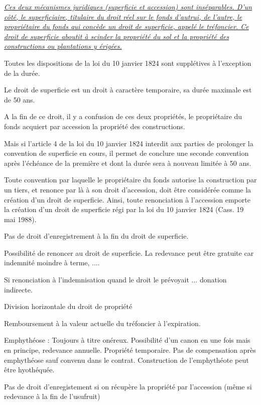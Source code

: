 \documentclass{book}
\begin{document}
\underline{\textit{Ces deux mécanismes juridiques (superficie et accession) sont inséparables. D’un côté, le superficiaire, titulaire du droit réel sur le fonds d’autrui, de l’autre, le propriétaire du fonds qui concède un droit de superficie, appelé le tréfoncier. Ce droit de superficie aboutit à scinder la propriété du sol et la propriété des constructions ou plantations y érigées.}}

Toutes les dispositions de la loi du 10 janvier 1824 sont supplétives à l’exception de la durée.

Le droit de superficie est un droit à caractère temporaire, sa durée maximale est de 50 ans.

A la fin de ce droit, il y a confusion de ces deux propriétés, le propriétaire du fonds acquiert par accession la propriété des constructions.

Mais si l’article 4 de la loi du 10 janvier 1824 interdit aux parties de prolonger la convention de superficie en cours, il permet de conclure une seconde convention après l’échéance de la première et dont la durée sera à nouveau limitée à 50 ans.

Toute convention par laquelle le propriétaire du fonds autorise la construction par un tiers, et renonce par là à son droit d’accession, doit être considérée comme la création d’un droit de superficie. Ainsi, toute renonciation à l’accession emporte la création d’un droit de superficie régi par la loi du 10 janvier 1824 (Cass. 19 mai 1988).

Pas de droit d'enregistrement à la fin du droit de superficie.

Possibilité de renoncer au droit de superficie. La redevance peut être gratuite car indemnité moindre à terme, ....

Si renonciation à l'indemnisation quand le droit le prévoyait ... donation indirecte.

Division horizontale du droit de propriété

Remboursement à la valeur actuelle du tréfoncier à l'expiration.

Emphythéose : Toujours à titre onéreux. Possibilité d'un canon en une fois mais en principe, redevance annuelle. Propriété temporaire. Pas de compensation après emphythéose sauf convenu dans le contrat. Construction de l'emphythéote peut être hyothéquée.

Pas de droit d'enregistement si on récupère la propriété par l'accession (même si redevance à la fin de l'usufruit) 


\nocite{*}

\end{document}
